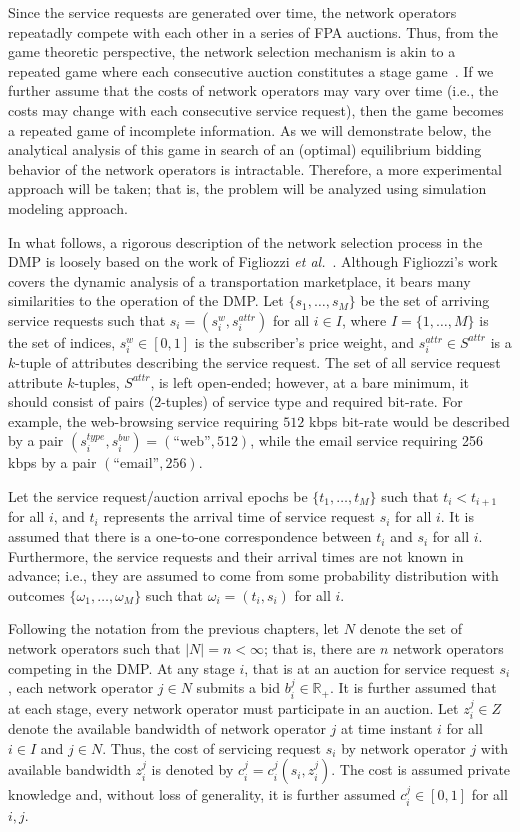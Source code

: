 Since the service requests are generated over time, the network operators repeatadly compete with each other in a series of FPA auctions. Thus, from the game theoretic perspective, the network selection mechanism is akin to a repeated game where each consecutive auction constitutes a stage game~\cite{BasarOlsder1999, Gibbons92}. If we further assume that the costs of network operators may vary over time (i.e., the costs may change with each consecutive service request), then the game becomes a repeated game of incomplete information. As we will demonstrate below, the analytical analysis of this game in search of an (optimal) equilibrium bidding behavior of the network operators is intractable. Therefore, a more experimental approach will be taken; that is, the problem will be analyzed using simulation modeling approach.

In what follows, a rigorous description of the network selection process in the DMP is loosely based on the work of Figliozzi \emph{et al.}~\cite{FigliozziJaillet2008}. Although Figliozzi's work covers the dynamic analysis of a transportation marketplace, it bears many similarities to the operation of the DMP. Let $\{s_1,\ldots,s_M\}$ be the set of arriving service requests such that $s_i = (s^w_i, s^{attr}_i)$ for all $i\in I$, where $I=\{1,\ldots,M\}$ is the set of indices, $s^w_i\in [0,1]$ is the subscriber's price weight, and $s^{attr}_i\in S^{attr}$ is a $k$-tuple of attributes describing the service request. The set of all service request attribute $k$-tuples, $S^{attr}$, is left open-ended; however, at a bare minimum, it should consist of pairs ($2$-tuples) of service type and required bit-rate. For example, the web-browsing service requiring $512$ kbps bit-rate would be described by a pair $(s_i^{type},s_i^{bw}) = (\text{``web''}, 512)$, while the email service requiring 256 kbps by a pair $(\text{``email''}, 256)$.

Let the service request/auction arrival epochs be $\{t_1,\ldots,t_M\}$ such that $t_i < t_{i+1}$ for all $i$, and $t_i$ represents the arrival time of service request $s_i$ for all $i$. It is assumed that there is a one-to-one correspondence between $t_i$ and $s_i$ for all $i$. Furthermore, the service requests and their arrival times are not known in advance; i.e., they are assumed to come from some probability distribution with outcomes $\{\omega_1,\ldots,\omega_M\}$ such that $\omega_i = (t_i, s_i)$ for all $i$.

Following the notation from the previous chapters, let $N$ denote the set of network operators such that $|N| = n < \infty$; that is, there are $n$ network operators competing in the DMP. At any stage $i$, that is at an auction for service request $s_i$, each network operator $j\in N$ submits a bid $b^j_i\in\mathbb{R}_+$. It is further assumed that at each stage, every network operator must participate in an auction. Let $z^j_i\in Z$ denote the available bandwidth of network operator $j$ at time instant $i$ for all $i\in I$ and $j\in N$. Thus, the cost of servicing request $s_i$ by network operator $j$ with available bandwidth $z^j_i$ is denoted by $c^j_i = c^j_i(s_i,z^j_i)$. The cost is assumed private knowledge and, without loss of generality, it is further assumed $c^j_i\in [0,1]$ for all $i,j$.

